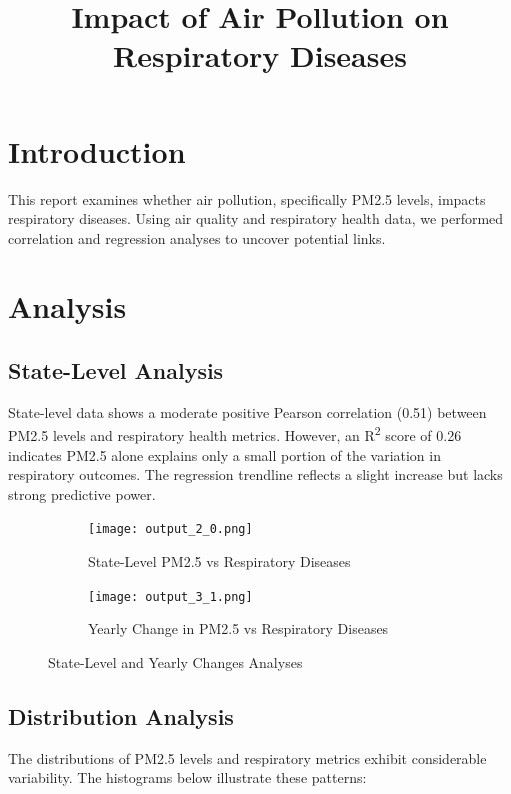 \documentclass[11pt]{article}
\title{Impact of Air Pollution on Respiratory Diseases}
\author{}
\date{}
\begin{document}
\maketitle

\section*{Introduction}
This report examines whether air pollution, specifically PM2.5 levels, impacts respiratory diseases. Using air quality and respiratory health data, we performed correlation and regression analyses to uncover potential links.

\section*{Analysis}

\subsection*{State-Level Analysis}
State-level data shows a moderate positive Pearson correlation (0.51) between PM2.5 levels and respiratory health metrics. However, an R\textsuperscript{2} score of 0.26 indicates PM2.5 alone explains only a small portion of the variation in respiratory outcomes. The regression trendline reflects a slight increase but lacks strong predictive power.

\begin{figure}[H]
    \centering
    \begin{subfigure}{0.48\textwidth}
        \centering
        \texttt{[image: output\_2\_0.png]}
        \caption{State-Level PM2.5 vs Respiratory Diseases}
    \end{subfigure}
    \hfill
    \begin{subfigure}{0.48\textwidth}
        \centering
        \texttt{[image: output\_3\_1.png]}
        \caption{Yearly Change in PM2.5 vs Respiratory Diseases}
    \end{subfigure}
    \caption{State-Level and Yearly Changes Analyses}
\end{figure}

\subsection*{Distribution Analysis}
The distributions of PM2.5 levels and respiratory metrics exhibit considerable variability. The histograms below illustrate these patterns:
\end{document}
